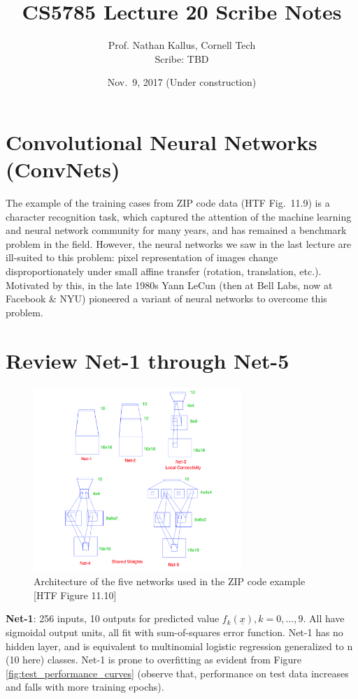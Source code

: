\documentclass[a4paper]{article}
\title{CS5785 Lecture 20 Scribe Notes}
\author{Prof. Nathan Kallus, Cornell Tech \\Scribe: TBD}
\date{Nov.\ 9, 2017 (Under construction)}
\begin{document}
\maketitle

\section{Convolutional Neural Networks (ConvNets)}

The example of the training cases from ZIP code data (HTF Fig.~11.9) is a character recognition task, which captured the attention of the machine learning and neural network community for many years, and has remained a benchmark problem in the field. However, the neural networks we saw in the last lecture are ill-suited to this problem: pixel representation of images change disproportionately under small affine transfer (rotation, translation, etc.). Motivated by this, in the late 1980s Yann LeCun (then at Bell Labs, now at Facebook \& NYU) pioneered a variant of neural networks to overcome this problem.\\

\section{Review Net-1 through Net-5}

\begin{figure}[h]
\centering
\includegraphics[width=0.7\textwidth]{Architecture_of_the_five_networks}
\caption{Architecture of the five networks used in the ZIP code example [HTF Figure 11.10]}
\end{figure}

\textbf{Net-1}: 256 inputs, 10 outputs for predicted value $f_{k}(\underline{x}), k=0, ..., 9$. All have sigmoidal output units, all fit with sum-of-squares error function. Net-1 has no hidden layer, and is equivalent to  multinomial logistic regression generalized to n (10 here) classes. Net-1 is prone to overfitting as evident from  Figure \ref{fig:test_performance_curves} (observe that, performance on test data increases and falls with more training epochs).\\
\end{document}
